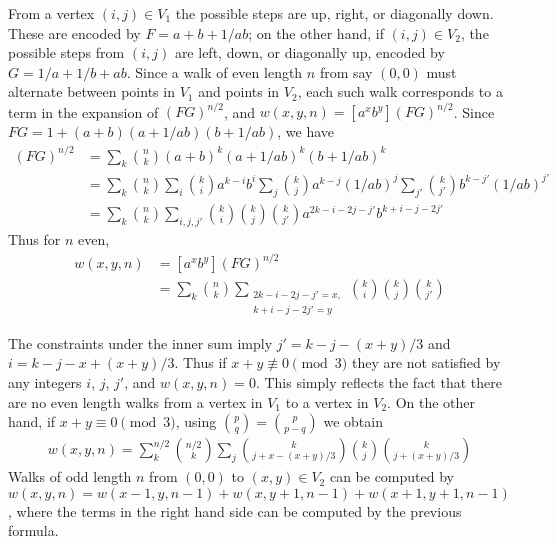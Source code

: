 \documentclass[12pt]{article}
\begin{document}
From a vertex $(i,j) \in V_1$ the possible steps are up, right, or diagonally down. These are encoded by $F = a + b + 1/ab$; on the other hand, if $(i,j) \in V_2$, the possible steps from $(i,j)$ are left, down, or diagonally up, encoded by $G = 1/a + 1/b + ab$. Since a walk of even length $n$ from say $(0,0)$ must alternate between points in $V_1$ and points in $V_2$, each such walk corresponds to a term in the expansion of $(FG)^{n/2}$, and $w(x,y,n) = [a^xb^y](FG)^{n/2}$. Since $FG = 1 + (a+b)(a+1/ab)(b+1/ab)$, we have
\begin{align*}
(FG)^{n/2} & = \sum_k \binom{n}{k} (a+b)^k(a+1/ab)^k(b+1/ab)^k \\
  &= \sum_k \binom{n}{k} \sum_i \binom{k}{i} a^{k-i}b^i \sum_j\binom{k}{j}a^{k-j}(1/ab)^j \sum_{j'}\binom{k}{j'}b^{k-j'}(1/ab)^{j'} \\
  &= \sum_k\binom{n}{k}\sum_{i,j,j'}\binom{k}{i}\binom{k}{j}\binom{k}{j'} a^{2k-i-2j-j'} b^{k+i-j-2j'}
\end{align*}
Thus for $n$ even,
\begin{align*}
w(x,y,n) &= [a^xb^y](FG)^{n/2} \\
  &= \sum_k\binom{n}{k}\sum_{\substack{2k-i-2j-j'=x,\\k+i-j-2j'=y}}\binom{k}{i}\binom{k}{j}\binom{k}{j'}
\end{align*}

The constraints under the inner sum imply $j' = k - j - (x+y)/3$ and $i = k -j -x + (x+y)/3$. Thus if $x+y \not\equiv 0 \pmod{3}$ they are not satisfied by any integers $i$, $j$, $j'$, and $w(x,y,n) = 0$. This simply reflects the fact that there are no even length walks from a vertex in $V_1$ to a vertex in $V_2$.  On the other hand, if $x+y \equiv 0 \pmod{3}$, using $\binom{p}{q} = \binom{p}{p-q}$ we obtain
\begin{align*}
  w(x,y,n) = \sum_k^{n/2} \binom{n/2}{k} \sum_j \binom{k}{j + x-(x+y)/3} \binom{k}{j} \binom{k}{j + (x+y)/3}
\end{align*}
Walks of odd length $n$ from $(0,0)$ to $(x,y) \in V_2$ can be computed by $w(x,y,n) = w(x-1,y,n-1) + w(x, y+1, n-1) + w(x+1, y+1, n-1)$, where the terms in the right hand side can be computed by the previous formula.
\end{document}
